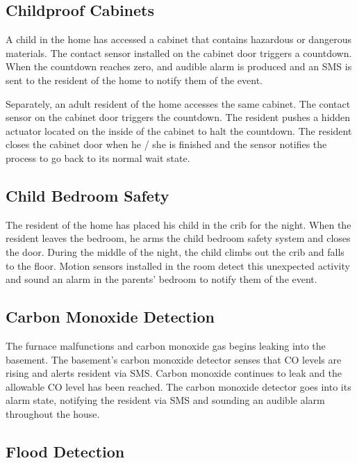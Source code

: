 \documentclass{report}
\begin{document}
\subsection*{Childproof Cabinets}

A child in the home has accessed a cabinet that contains hazardous or dangerous
materials. The contact sensor installed on the cabinet door triggers a
countdown. When the countdown reaches zero, and audible alarm is produced and
an SMS is sent to the resident of the home to notify them of the event.

Separately, an adult resident of the home accesses the same cabinet. The
contact sensor on the cabinet door triggers the countdown. The resident pushes
a hidden actuator located on the inside of the cabinet to halt the countdown.
The resident closes the cabinet door when he / she is finished and the sensor
notifies the process to go back to its normal wait state.

\subsection*{Child Bedroom Safety}

The resident of the home has placed his child in the crib for the night. When
the resident leaves the bedroom, he arms the child bedroom safety system and
closes the door. During the middle of the night, the child climbs out the crib
and falls to the floor. Motion sensors installed in the room detect this
unexpected activity and sound an alarm in the parents' bedroom to notify them
of the event.

\subsection*{Carbon Monoxide Detection}

The furnace malfunctions and carbon monoxide gas begins leaking into the
basement. The basement's carbon monoxide detector senses that CO levels are
rising and alerts resident via SMS. Carbon monoxide continues to leak and the
allowable CO level has been reached. The carbon monoxide detector goes into its
alarm state, notifying the resident via SMS and sounding an audible alarm
throughout the house.

\subsection*{Flood Detection}
\end{document}

